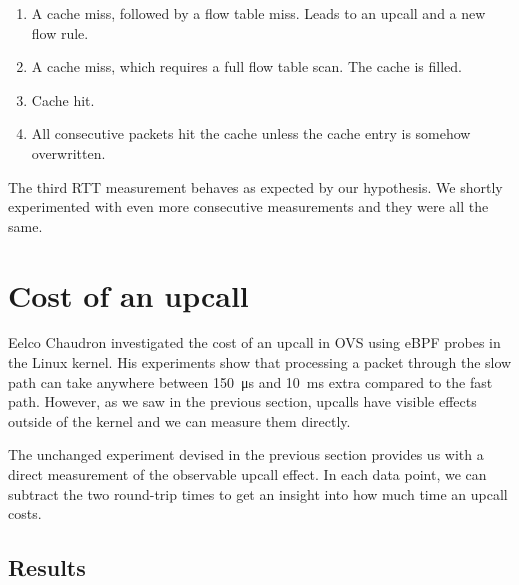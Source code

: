\begin{enumerate}
    \item A cache miss, followed by a flow table miss. Leads to an upcall and a new flow rule.
    \item A cache miss, which requires a full flow table scan. The cache is filled.
    \item Cache hit.
    \item All consecutive packets hit the cache unless the cache entry is somehow overwritten.
\end{enumerate}

The third RTT measurement behaves as expected by our hypothesis. We shortly experimented with even more consecutive measurements and they were all the same.


\section{Cost of an upcall}
\label{design:upcall-cost}

Eelco Chaudron investigated the cost of an upcall in OVS \cite{UpcallCost} using eBPF probes in the Linux kernel. His experiments show that processing a packet through the slow path can take anywhere between \qty{150}{\us} and \qty{10}{\ms} extra compared to the fast path. However, as we saw in the previous section, upcalls have visible effects outside of the kernel and we can measure them directly.

The unchanged experiment devised in the previous section provides us with a direct measurement of the observable upcall effect. In each data point, we can subtract the two round-trip times to get an insight into how much time an upcall costs.


\subsection{Results}
\label{res:upcall-cost}

